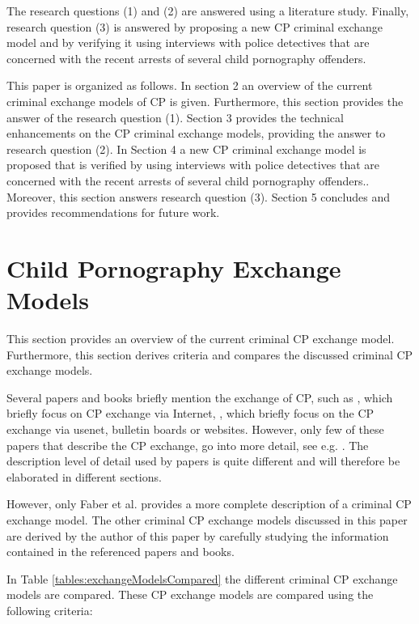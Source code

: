 \documentclass{sig-alternate-br}
\begin{document}
The research questions (1) and (2) are answered using a literature study. Finally, research question (3) is answered by proposing a new CP criminal exchange model and by verifying it using interviews with police detectives that are concerned with the recent arrests of several child pornography offenders.

This paper is organized as follows. In section 2 an overview of the current criminal exchange models of CP is given. Furthermore, this section provides the answer of the research question (1). Section 3 provides the technical enhancements on the CP criminal exchange models, providing the answer to research question (2). In Section 4 a new CP criminal exchange model is proposed that is verified by using interviews with police detectives that are concerned with the recent arrests of several child pornography offenders.. Moreover, this section answers research question (3). Section 5 concludes and provides recommendations for future work.


\section{Child Pornography Exchange Models}
This section provides an overview of the current criminal CP exchange model. Furthermore, this section derives criteria and compares the discussed criminal CP exchange models.

Several papers and books briefly mention the exchange of CP, such as \cite{wolak2005child, jenkins2001beyond, webb2007characteristics}, which briefly focus on CP exchange via Internet, \cite{quayle2002paedophiles, beech2008internet}, which briefly focus on the CP exchange via usenet, bulletin boards or websites. However, only few of these papers that describe the CP exchange, 	go into more detail, see e.g. \cite{en2011phishing,wortley2006child,wijk2009achter,callanan2009internet}. The description level of detail used by papers is quite different and will therefore be elaborated in different sections.

However, only Faber et al. \cite{en2011phishing} provides a more complete description of a criminal CP exchange model. The other criminal CP exchange models discussed in this paper are derived by the author of this paper by carefully studying the information contained in the referenced papers and books.

In Table \ref{tables:exchangeModelsCompared} the different criminal CP exchange models are compared. These CP exchange models are compared using the following criteria: 
\end{document}
